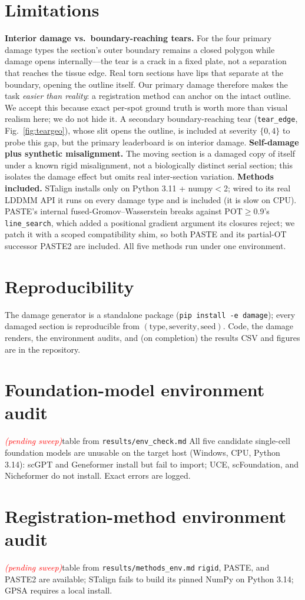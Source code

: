 \documentclass[11pt]{article}
\newcommand{\pending}{\textcolor{red}{\emph{(pending sweep)}}}
\begin{document}
\section{Limitations}
\label{sec:limitations}
\textbf{Interior damage vs.\ boundary-reaching tears.} For the four primary
damage types the section's outer boundary remains a closed polygon while damage
opens internally---the tear is a crack in a fixed plate, not a separation that
reaches the tissue edge. Real torn sections have lips that separate at the
boundary, opening the outline itself. Our primary damage therefore makes the task
\emph{easier than reality}: a registration method can anchor on the intact
outline. We accept this because exact per-spot ground truth is worth more than
visual realism here; we do not hide it. A secondary boundary-reaching tear
(\texttt{tear\_edge}, Fig.~\ref{fig:teargeo}), whose slit opens the outline, is
included at severity $\{0,4\}$ to probe this gap, but the primary leaderboard is
on interior damage. \textbf{Self-damage plus synthetic misalignment.} The moving
section is a damaged copy of itself under a known rigid misalignment, not a
biologically distinct serial section; this isolates the damage effect but omits
real inter-section variation. \textbf{Methods included.} STalign installs only on
Python 3.11 + numpy$<$2; wired to its real LDDMM API it runs on every damage type
and is included (it is slow on CPU). PASTE's internal fused-Gromov--Wasserstein
breaks against POT$\geq$0.9's \texttt{line\_search}, which added a positional
gradient argument its closures reject; we patch it with a scoped compatibility
shim, so both PASTE and its partial-OT successor PASTE2 are included. All five
methods run under one environment.

\section{Reproducibility}
The damage generator is a standalone package (\texttt{pip install -e damage});
every damaged section is reproducible from $(\text{type},\text{severity},
\text{seed})$. Code, the damage renders, the environment audits, and (on
completion) the results CSV and figures are in the repository.

\appendix
\section{Foundation-model environment audit}
\label{sec:envcheck}
\pending{table from \texttt{results/env\_check.md}} All five candidate single-cell
foundation models are unusable on the target host (Windows, CPU, Python 3.14):
scGPT and Geneformer install but fail to import; UCE, scFoundation, and
Nicheformer do not install. Exact errors are logged.

\section{Registration-method environment audit}
\label{sec:methodenv}
\pending{table from \texttt{results/methods\_env.md}} \texttt{rigid}, PASTE, and
PASTE2 are available; STalign fails to build its pinned NumPy on Python 3.14;
GPSA requires a local install.



\end{document}
